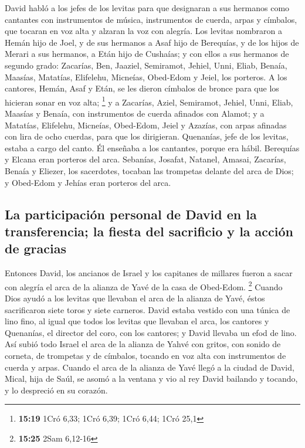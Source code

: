  David habló a los jefes de los levitas para que
designaran a sus hermanos como cantantes con instrumentos de música,
instrumentos de cuerda, arpas y címbalos, que tocaran en voz alta y
alzaran la voz con alegría.  Los levitas nombraron a
Hemán hijo de Joel, y de sus hermanos a Asaf hijo de Berequías, y de los
hijos de Merari a sus hermanos, a Etán hijo de Cushaías; 
y con ellos a sus hermanos de segundo grado: Zacarías, Ben, Jaaziel,
Semiramot, Jehiel, Unni, Eliab, Benaía, Maasías, Matatías, Elifelehu,
Micneías, Obed-Edom y Jeiel, los porteros.  A los
cantores, Hemán, Asaf y Etán, se les dieron címbalos de bronce para que
los hicieran sonar en voz alta; \footnote{\textbf{15:19} 1Cró 6,33; 1Cró
  6,39; 1Cró 6,44; 1Cró 25,1}  y a Zacarías, Aziel,
Semiramot, Jehiel, Unni, Eliab, Maasías y Benaía, con instrumentos de
cuerda afinados con Alamot;  y a Matatías, Elifelehu,
Micneías, Obed-Edom, Jeiel y Azazías, con arpas afinadas con lira de
ocho cuerdas, para que los dirigieran.  Quenanías, jefe
de los levitas, estaba a cargo del canto. Él enseñaba a los cantantes,
porque era hábil.  Berequías y Elcana eran porteros del
arca.  Sebanías, Josafat, Natanel, Amasai, Zacarías,
Benaía y Eliezer, los sacerdotes, tocaban las trompetas delante del arca
de Dios; y Obed-Edom y Jehías eran porteros del arca.

\hypertarget{la-participaciuxf3n-personal-de-david-en-la-transferencia-la-fiesta-del-sacrificio-y-la-acciuxf3n-de-gracias}{%
\subsection{La participación personal de David en la transferencia; la
fiesta del sacrificio y la acción de
gracias}\label{la-participaciuxf3n-personal-de-david-en-la-transferencia-la-fiesta-del-sacrificio-y-la-acciuxf3n-de-gracias}}

 Entonces David, los ancianos de Israel y los capitanes
de millares fueron a sacar con alegría el arca de la alianza de Yavé de
la casa de Obed-Edom. \footnote{\textbf{15:25} 2Sam 6,12-16}
 Cuando Dios ayudó a los levitas que llevaban el arca de
la alianza de Yavé, éstos sacrificaron siete toros y siete carneros.
 David estaba vestido con una túnica de lino fino, al
igual que todos los levitas que llevaban el arca, los cantores y
Quenanías, el director del coro, con los cantores; y David llevaba un
efod de lino.  Así subió todo Israel el arca de la
alianza de Yahvé con gritos, con sonido de corneta, de trompetas y de
címbalos, tocando en voz alta con instrumentos de cuerda y arpas.
 Cuando el arca de la alianza de Yavé llegó a la ciudad
de David, Mical, hija de Saúl, se asomó a la ventana y vio al rey David
bailando y tocando, y lo despreció en su corazón.


